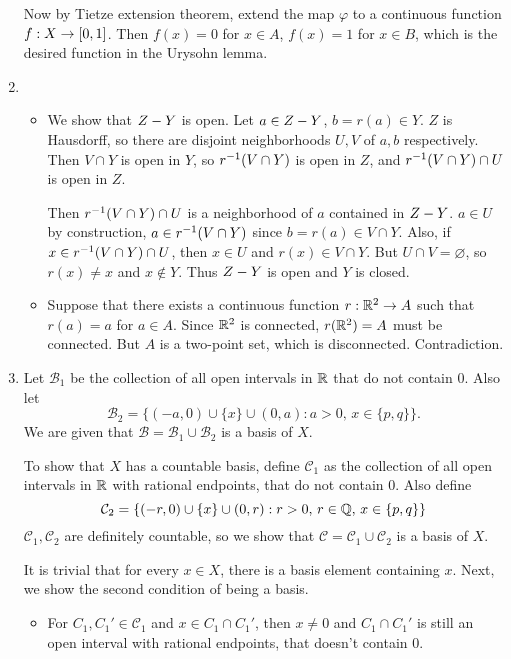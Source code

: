 \documentclass[12pt]{report}
\newcommand{\prob}[1]{\item[\large\textbf{\sffamily #1.}]}
\newcommand{\subprob}[1]{\item[\textbf{\sffamily (#1)}]}
\newcommand{\B}{\mathcal{B}}
\renewcommand{\C}{\mathcal{C}}
\begin{document}
\begin{enumerate}
    Now by Tietze extension theorem, extend the map \(\varphi\) to a continuous function \(f : X \rightarrow [0, 1]\). Then \(f(x) = 0\) for \(x \in A\), \(f(x) = 1\) for \(x \in B\), which is the desired function in the Urysohn lemma.

    \prob{7}
    \begin{itemize}
        \subprob{a} We show that \(Z - Y\) is open. Let \(a \in Z - Y\), \(b = r(a) \in Y\). \(Z\) is Hausdorff, so there are disjoint neighborhoods \(U, V\) of \(a, b\) respectively. Then \(V \cap Y\) is open in \(Y\), so \(r^{-1}(V\cap Y)\) is open in \(Z\), and \(r^{-1}(V\cap Y) \cap U\) is open in \(Z\).

        Then \(r^{-1}(V\cap Y) \cap U\) is a neighborhood of \(a\) contained in \(Z - Y\). \(a \in U\) by construction, \(a \in r^{-1}(V\cap Y)\) since \(b = r(a) \in V \cap Y\). Also, if \(x \in r^{-1}(V\cap Y) \cap U\), then \(x \in U\) and \(r(x) \in V \cap Y\). But \(U \cap V = \varnothing\), so \(r(x) \neq x\) and \(x \notin Y\). Thus \(Z - Y\) is open and \(Y\) is closed.

        \subprob{b} Suppose that there exists a continuous function \(r : \mathbb{R}^2 \rightarrow A\) such that \(r(a) = a\) for \(a \in A\). Since \(\mathbb{R}^2\) is connected, \(r(\mathbb{R}^2) = A\) must be connected. But \(A\) is a two-point set, which is disconnected. Contradiction.
    \end{itemize}

    \prob{8} Let \(\B_1\) be the collection of all open intervals in \(\mathbb{R}\) that do not contain \(0\). Also let
    \[
        \B_2 = \{(-a, 0) \cup \{x\} \cup (0, a) : a > 0,\, x \in \{p
    , q\}\}.
    \]
    We are given that \(\B = \B_1 \cup \B_2\) is a basis of \(X\).

    To show that \(X\) has a countable basis, define \(\C_1\) as the collection of all open intervals in \(\mathbb{R}\) with rational endpoints, that do not contain \(0\). Also define
    \[
        \C_2 = \{(-r, 0) \cup \{x\} \cup (0, r) : r > 0,\, r \in \Q,\, x \in \{p, q\}\}
    \]
    \(\C_1, \C_2\) are definitely countable, so we show that \(\C = \C_1 \cup \C_2\) is a basis of \(X\).

    It is trivial that for every \(x \in X\), there is a basis element containing \(x\). Next, we show the second condition of being a basis.
    \begin{itemize}
        \item For \(C_1, C_1' \in \C_1\) and \(x \in C_1 \cap C_1'\), then \(x \neq 0\) and \(C_1 \cap C_1'\) is still an open interval with rational endpoints, that doesn't contain \(0\).


\end{itemize}
\end{enumerate}
\end{document}
